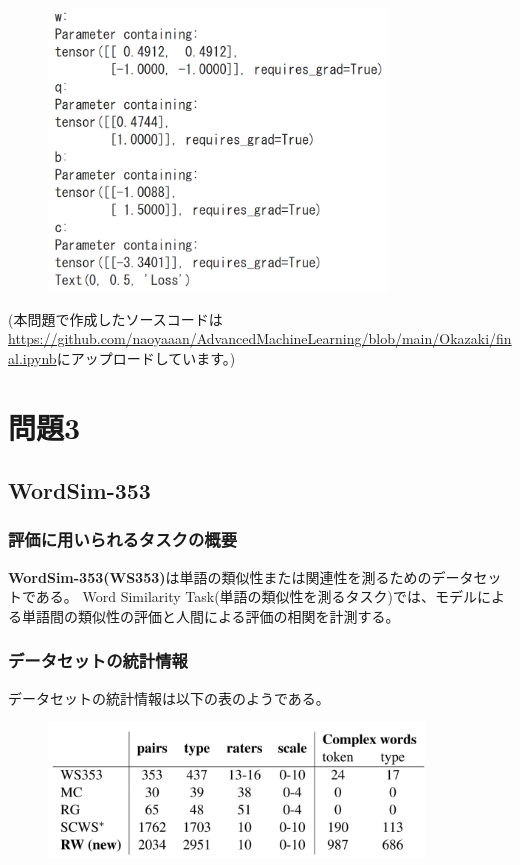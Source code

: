\documentclass[a4j,11pt]{jarticle}
\begin{document}
\begin{figure}[hbtp]
    \centering
    \includegraphics[width=9cm]{p2-2.png}
\end{figure}

(本問題で作成したソースコードは\url{https://github.com/naoyaaan/AdvancedMachineLearning/blob/main/Okazaki/final.ipynb}にアップロードしています。)

\newpage
\section{問題3}

\subsection{WordSim-353}
\subsubsection*{評価に用いられるタスクの概要}
\textbf{WordSim-353(WS353)}は単語の類似性または関連性を測るためのデータセットである。
Word Similarity Task(単語の類似性を測るタスク)では、モデルによる単語間の類似性の評価と人間による評価の相関を計測する。

\subsubsection*{データセットの統計情報}
データセットの統計情報は以下の表のようである。

\begin{figure}[hbtp]
    \centering
    \includegraphics[width=10cm]{p3-1.png}
\end{figure}
\end{document}
